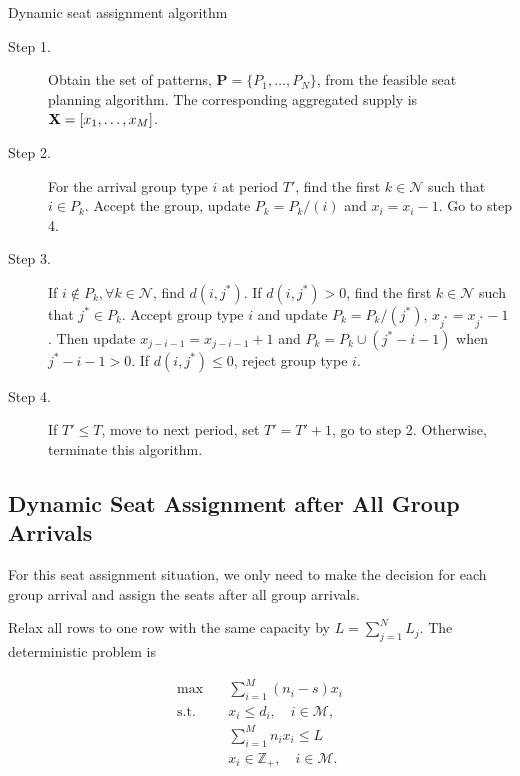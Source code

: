 \begin{algorithm}[H]
  \caption{Dynamic seat assignment algorithm}\label{algo_nested_policy}
  \begin{description}
    \item[Step 1.] Obtain the set of patterns, $\mathbf{P} = \{P_1,\ldots,P_{N}\}$, from the feasible seat planning algorithm. The corresponding aggregated supply is $\mathbf{X} = [x_{1}, \ldots, x_{M}]$.
    \item[Step 2.] For the arrival group type $i$ at period $T{'}$, find the first $k \in \mathcal{N}$ such that $i \in P_k$. Accept the group, update $P_{k} = P_{k}/(i)$ and $x_{i} = x_{i} -1$. Go to step 4.
    \item[Step 3.] If $i \notin P_k, \forall k \in \mathcal{N}$, find $d(i,j^{*})$. If $d(i,j^{*})>0$, find the first $k \in \mathcal{N}$ such that $j^{*} \in P_k$. Accept group type $i$ and update $P_{k} = P_{k}/(j^{*})$, $x_{j^{*}} = x_{j^{*}} -1$. Then update $x_{j-i-1} = x_{j-i-1} + 1$ and $P_{k}= P_{k} \cup (j^{*}-i-1)$ when $j^{*}-i-1 > 0$. If $d(i,j^{*}) \leq 0$, reject group type $i$.
    \item[Step 4.] If $T{'} \leq T$, move to next period, set $T{'} = T{'}+1$, go to step 2. Otherwise, terminate this algorithm.
  \end{description}
\end{algorithm}

\subsection{Dynamic Seat Assignment after All Group Arrivals}
For this seat assignment situation, we only need to make the decision for each group arrival and assign the seats after all group arrivals.

Relax all rows to one row with the same capacity by $L = \sum_{j=1}^{N} L_j$. The deterministic problem is

\begin{equation}\label{relax_deter}
  \begin{aligned}
  \max \quad & \sum_{i=1}^{M} (n_i- s) x_{i} \\
  \text {s.t.} \quad & x_{i} \leq d_{i}, \quad i \in \mathcal{M}, \\
  & \sum_{i=1}^{M} n_{i} x_{i} \leq L \\
  & x_{i} \in \mathbb{Z}_{+}, \quad i \in \mathcal{M}.
  \end{aligned}
\end{equation}


